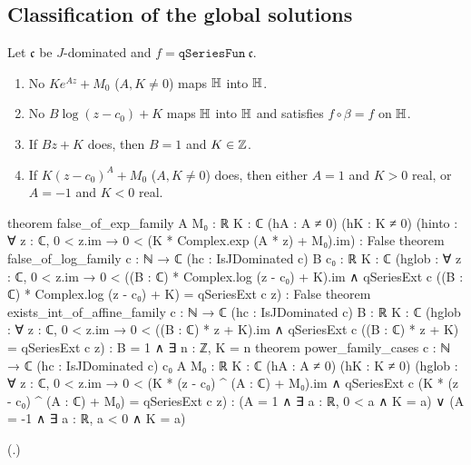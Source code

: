 \subsection{Classification of the global solutions}

\begin{theorem}\label{ch19:thm:classification}
Let $\mathfrak c$ be $J$-dominated and $f=\mathtt{qSeriesFun}\ \mathfrak c$.
\begin{enumerate}[label=(\alph*)]
\item No $Ke^{Az}+M_0$ ($A,K\ne0$) maps $\mathbb{H}$ into $\mathbb{H}$.
\item No $B\log(z-c_0)+K$ maps $\mathbb{H}$ into $\mathbb{H}$ and satisfies $f\circ\beta=f$ on $\mathbb{H}$.
\item If $Bz+K$ does, then $B=1$ and $K\in{\mathbb{Z}}$.
\item If $K(z-c_0)^A+M_0$ ($A,K\ne0$) does, then either $A=1$ and $K>0$ real, or $A=-1$ and $K<0$ real.
\end{enumerate}
\end{theorem}
\begin{leancode}
theorem false_of_exp_family {A M₀ : ℝ} {K : ℂ} (hA : A ≠ 0) (hK : K ≠ 0)
    (hinto : ∀ z : ℂ, 0 < z.im → 0 < (K * Complex.exp (A * z) + M₀).im) : False
theorem false_of_log_family {c : ℕ → ℂ} (hc : IsJDominated c) {B c₀ : ℝ} {K : ℂ}
    (hglob : ∀ z : ℂ, 0 < z.im → 0 < ((B : ℂ) * Complex.log (z - c₀) + K).im ∧
      qSeriesExt c ((B : ℂ) * Complex.log (z - c₀) + K) = qSeriesExt c z) : False
theorem exists_int_of_affine_family {c : ℕ → ℂ} (hc : IsJDominated c) {B : ℝ} {K : ℂ}
    (hglob : ∀ z : ℂ, 0 < z.im → 0 < ((B : ℂ) * z + K).im ∧
      qSeriesExt c ((B : ℂ) * z + K) = qSeriesExt c z) :
    B = 1 ∧ ∃ n : ℤ, K = n
theorem power_family_cases {c : ℕ → ℂ} (hc : IsJDominated c) {c₀ A M₀ : ℝ} {K : ℂ}
    (hA : A ≠ 0) (hK : K ≠ 0)
    (hglob : ∀ z : ℂ, 0 < z.im → 0 < (K * (z - c₀) ^ (A : ℂ) + M₀).im ∧
      qSeriesExt c (K * (z - c₀) ^ (A : ℂ) + M₀) = qSeriesExt c z) :
    (A = 1 ∧ ∃ a : ℝ, 0 < a ∧ K = a) ∨ (A = -1 ∧ ∃ a : ℝ, a < 0 ∧ K = a)
\end{leancode}
(.)
